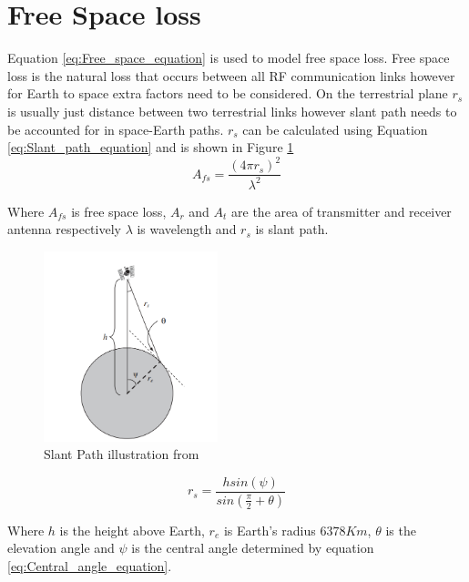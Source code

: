 \documentclass[conference]{IEEEtran}
\begin{document}
\section{Free Space loss}
Equation \ref{eq:Free_space_equation} is used to model free space loss. Free space loss is the natural loss that occurs between all RF communication links \cite{seybold_introduction_2005} however for Earth to space extra factors need to be considered. On the terrestrial plane $r_s$ is usually just distance between two terrestrial links however slant path needs to be accounted for in space-Earth paths. $r_s$ can be calculated using Equation \ref{eq:Slant_path_equation} and is shown in Figure \ref{fig:Slant_path_illustration}\\
\begin{equation}
A_{fs} = \frac{(4 \pi r_s)^2}{\lambda^2 }
\label{eq:Free_space_equation}
\end{equation}

Where $A_{fs}$ is free space loss, $A_r$ and $A_t$ are the area of transmitter and receiver antenna respectively $\lambda$ is wavelength and $r_s$ is slant path.\\
\begin{figure}[h]
\centering
	\includegraphics[width = 0.45\textwidth]{Slant_path.png}
	\caption{Slant Path illustration from \cite{seybold_introduction_2005}}
	\label{fig:Slant_path_illustration}
\end{figure}


\begin{equation}
r_s = \frac{h sin(\psi)}{sin(\frac{\pi}{2}+\theta)}
\label{eq:Slant_path_equation}
\end{equation}

Where $h$ is the height above Earth, $r_e$ is Earth's radius $6378K m$, $\theta$ is the elevation angle and $\psi$ is the central angle determined by equation \ref{eq:Central_angle_equation}.\\
\end{document}
